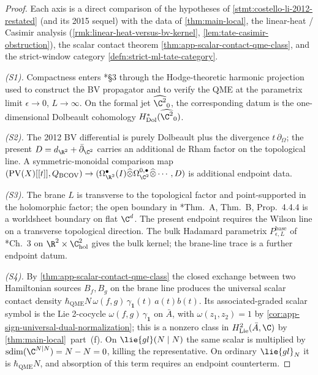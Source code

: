 \begin{proof}
  Each axis is a direct comparison of the hypotheses of
  \ref{stmt:costello-li-2012-restated} (and its 2015 sequel) with the
  data of \ref{thm:main-local}, the linear-heat / Casimir analysis
  (\ref{rmk:linear-heat-versus-bv-kernel},
  \ref{lem:tate-casimir-obstruction}), the scalar contact theorem
  \ref{thm:app-scalar-contact-qme-class}, and the strict-window category
  \ref{defn:strict-ml-tate-category}.

  \emph{(S1).}  Compactness enters \cite{costello-li-quantum-bcov}*{\S3}
  through the Hodge-theoretic harmonic projection used to construct
  the BV propagator and to verify the QME at the parametrix limit
  \(\epsilon\to0\), \(L\to\infty\).  On the formal jet
  \(\widehat{\C^2}_0\), the corresponding datum is the
  one-dimensional Dolbeault cohomology
  \(H^*_{\mathrm{Dol}}(\widehat{\C^2}_0)\).

  \emph{(S2).}  The 2012 BV differential is purely Dolbeault plus the
  divergence \(t\,\partial_\Omega\); the present
  \(D=d_{\R^2}+\bar\partial_{\C^2}\) carries an additional de Rham
  factor on the topological line.  A symmetric-monoidal comparison map
  \((\mathrm{PV}(X)[[t]],Q_{\mathrm{BCOV}})\to(\Omega^\bullet_{\R^2}
  (I)\widehat\otimes\Omega^{0,\bullet}_{\C^2}\widehat\otimes\cdots,D)\)
  is additional endpoint data.

  \emph{(S3).}  The brane \(L\) is transverse to the topological
  factor and point-supported in the holomorphic factor; the open
  boundary in
  \cite{costello-li-open-closed-bcov}*{Thm.~A, Thm.~B, Prop.~4.4.4}
  is a worldsheet
  boundary on flat \(\C^d\).  The present endpoint requires the Wilson
  line on a transverse topological direction.  The bulk Hadamard parametrix
  \(P^{\mathrm{base}}_{\epsilon,L}\) of
  \cite{costello-renormalization}*{Ch.~3} on
  \(\R^2\times\C^2_{\mathrm{hol}}\) gives the bulk kernel; the
  brane-line trace is a further endpoint datum.

  \emph{(S4).}  By \ref{thm:app-scalar-contact-qme-class} the closed
  exchange between two Hamiltonian sources
  \(B_f,B_g\) on the brane line produces the universal scalar contact
  density
  \(\hbar_{\mathrm{QME}} N\,\omega(f,g)\,\gamma_{\mathbf 1}(t)\,a(t)b(t)\).  Its
  associated-graded scalar symbol is the Lie 2-cocycle
  \(\omega(f,g)\,\gamma_{\mathbf 1}\) on \(\bar A\), with
  \(\omega(z_1,z_2)=1\) by
  \ref{cor:app-sign-universal-dual-normalization}; this is a nonzero
  class in
  \(H^2_{\mathrm{Lie}}(\bar A,\C)\) by \ref{thm:main-local}~part~(f).
  On \(\lie{gl}(N\mid N)\) the same scalar is multiplied by
  \(\mathrm{sdim}(\C^{N|N})=N-N=0\), killing the representative.  On
  ordinary \(\lie{gl}_N\) it is \(\hbar_{\mathrm{QME}} N\), and absorption of this term
  requires an endpoint counterterm.


\end{proof}
